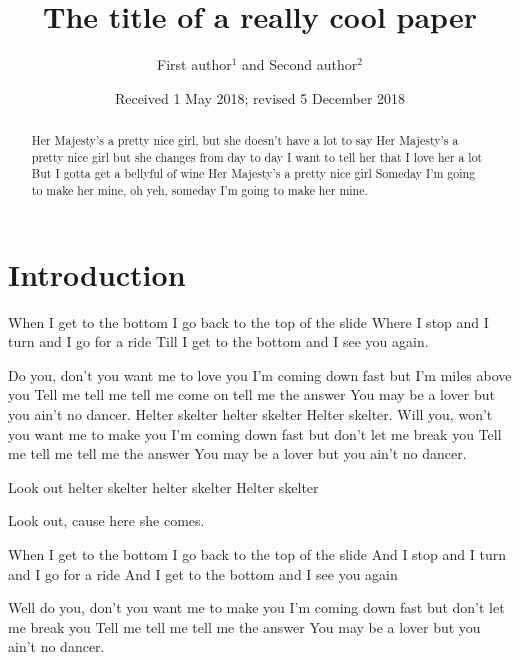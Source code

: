 \documentclass[vruler,JCS]{COB}
\begin{document}

\title{The title of a really cool paper}

\author{First author$^{1}$ and Second author$^{2}$}

\address{
}


\date{Received 1 May 2018; revised 5 December 2018}

\maketitle

\begin{abstract}
Her Majesty's a pretty nice girl,
but she doesn't have a lot to say
Her Majesty's a pretty nice girl
but she changes from day to day
I want to tell her that I love her a lot
But I gotta get a bellyful of wine
Her Majesty's a pretty nice girl
Someday I'm going to make her mine, oh yeh,
someday I'm going to make her mine.
\end{abstract}


\section{Introduction}\label{s:introduction}

When I get to the bottom I go back to the top of the slide
Where I stop and I turn and I go for a ride
Till I get to the bottom and I see you again.

Do you, don't you want me to love you
I'm coming down fast but I'm miles above you
Tell me tell me tell me come on tell me the answer
You may be a lover but you ain't no dancer.
Helter skelter helter skelter
Helter skelter.
Will you, won't you want me to make you
I'm coming down fast but don't let me break you
Tell me tell me tell me the answer
You may be a lover but you ain't no dancer.

Look out helter skelter helter skelter
Helter skelter 

Look out, cause here she comes.

When I get to the bottom I go back to the top of the slide
And I stop and I turn and I go for a ride
And I get to the bottom and I see you again

Well do you, don't you want me to make you
I'm coming down fast but don't let me break you
Tell me tell me tell me the answer
You may be a lover but you ain't no dancer.
\end{document}
